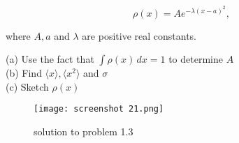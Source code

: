 \documentclass[svgnames]{article}   	%
\begin{document}
\vspace{5px} \[
  \rho(x) = Ae^{-\lambda (x-a)^2}, 
\] \vspace{5px}

where $A, a$ and  $\lambda$ are positive real constants. 

\begin{tcolorbox}	
  
  (a) Use the fact that $\int \rho(x) \, dx = 1$ to determine  $A$ \\
  (b) Find $\langle x \rangle, \langle x^2 \rangle$ and $\sigma$ \\
  (c) Sketch $\rho(x)$

\end{tcolorbox}	

\begin{figure}[H]
  \centering
    \texttt{[image: screenshot 21.png]}
    \caption{solution to problem 1.3}
\end{figure}
\end{document}
